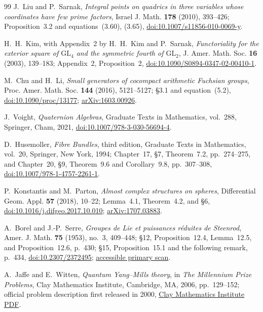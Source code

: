\begin{thebibliography}{99}
J.~Liu and P.~Sarnak,
\emph{Integral points on quadrics in three variables whose coordinates have
few prime factors},
Israel J. Math. \textbf{178} (2010), 393--426;
Proposition~3.2 and equations~(3.60), (3.65),
\href{https://doi.org/10.1007/s11856-010-0069-y}%
{doi:10.1007/s11856-010-0069-y}.

H.~H.~Kim, with Appendix~2 by H.~H.~Kim and P.~Sarnak,
\emph{Functoriality for the exterior square of $\mathrm{GL}_4$ and the
symmetric fourth of $\mathrm{GL}_2$},
J. Amer. Math. Soc. \textbf{16} (2003), 139--183;
Appendix~2, Proposition~2,
\href{https://doi.org/10.1090/S0894-0347-02-00410-1}%
{doi:10.1090/S0894-0347-02-00410-1}.

M.~Chu and H.~Li,
\emph{Small generators of cocompact arithmetic Fuchsian groups},
Proc. Amer. Math. Soc. \textbf{144} (2016), 5121--5127;
\S3.1 and equation~(5.2),
\href{https://doi.org/10.1090/proc/13177}{doi:10.1090/proc/13177};
\href{https://arxiv.org/abs/1603.00926}{arXiv:1603.00926}.

J.~Voight,
\emph{Quaternion Algebras}, Graduate Texts in Mathematics, vol.~288,
Springer, Cham, 2021,
\href{https://doi.org/10.1007/978-3-030-56694-4}%
{doi:10.1007/978-3-030-56694-4}.

D.~Husemoller,
\emph{Fibre Bundles}, third edition,
Graduate Texts in Mathematics, vol.~20, Springer, New York, 1994;
Chapter~17, \S7, Theorem~7.2, pp.~274--275, and
Chapter~20, \S9, Theorem~9.6 and Corollary~9.8, pp.~307--308,
\href{https://doi.org/10.1007/978-1-4757-2261-1}%
{doi:10.1007/978-1-4757-2261-1}.

P.~Konstantis and M.~Parton,
\emph{Almost complex structures on spheres},
Differential Geom. Appl. \textbf{57} (2018), 10--22;
Lemma~4.1, Theorem~4.2, and \S6,
\href{https://doi.org/10.1016/j.difgeo.2017.10.010}%
{doi:10.1016/j.difgeo.2017.10.010};
\href{https://arxiv.org/abs/1707.03883}{arXiv:1707.03883}.

A.~Borel and J.-P.~Serre,
\emph{Groupes de Lie et puissances r\'eduites de Steenrod},
Amer. J. Math. \textbf{75} (1953), no.~3, 409--448;
\S12, Proposition~12.4, Lemma~12.5, and Proposition~12.6, p.~430;
\S15, Proposition~15.1 and the following remark, p.~434,
\href{https://doi.org/10.2307/2372495}{doi:10.2307/2372495};
\href{https://www.maths.ed.ac.uk/~v1ranick/papers/borelserre.pdf}%
{accessible primary scan}.

A.~Jaffe and E.~Witten,
\emph{Quantum Yang--Mills theory}, in
\emph{The Millennium Prize Problems}, Clay Mathematics Institute,
Cambridge, MA, 2006, pp.~129--152; official problem description first
released in 2000,
\href{https://www.claymath.org/wp-content/uploads/2022/06/yangmills.pdf}%
{Clay Mathematics Institute PDF}.


\end{thebibliography}

